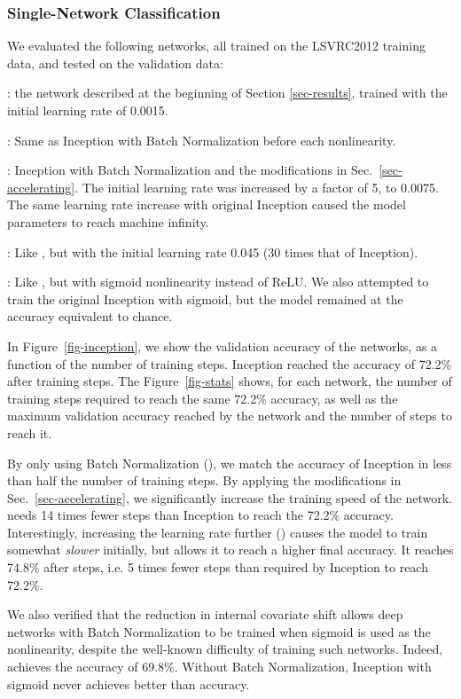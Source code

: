 \documentclass[twocolumn]{article}
\begin{document}
\subsubsection{Single-Network Classification}

We evaluated the following networks, all trained on the LSVRC2012 training data, and tested on the validation data:


: the network described at the beginning of Section \ref{sec-results}, trained with the initial learning rate of 0.0015.

: Same as Inception with Batch Normalization before each nonlinearity.

: Inception with Batch Normalization and the modifications  in Sec.~\ref{sec-accelerating}. The initial learning rate was increased by a factor of 5, to 0.0075. The same learning rate increase with original Inception caused the model parameters to reach machine infinity.

: Like , but with the initial learning rate  0.045 (30 times that of Inception).

: Like , but with sigmoid nonlinearity  instead of ReLU.
We also attempted to train the original Inception with sigmoid, but the model remained at the  accuracy equivalent to chance.

In Figure~\ref{fig-inception}, we show the validation accuracy of the
networks, as a function of the number of training steps.  Inception
reached the accuracy of 72.2\% after  training steps. The
Figure~\ref{fig-stats} shows, for each network, the number of training
steps required to reach the same 72.2\% accuracy, as well as the
maximum validation accuracy reached by the network and the number of steps
to reach it.
 
By only using Batch Normalization (), we match the accuracy of Inception in less than half the number of training steps. By applying the modifications in Sec.~\ref{sec-accelerating}, we significantly increase the training speed of the network.  needs 14 times fewer steps than Inception to reach the 72.2\% accuracy.
Interestingly, increasing the learning rate further ()  causes the model to train somewhat {\em slower} initially, but allows it to reach a higher final accuracy. It  reaches  74.8\% after  steps, i.e. 5 times fewer steps than required by Inception to reach 72.2\%.

We also verified that the  reduction in internal covariate shift allows deep networks with Batch Normalization to be trained when sigmoid is used as the nonlinearity, despite the well-known difficulty of training such networks. Indeed,  achieves the accuracy of  69.8\%. Without Batch Normalization, Inception with sigmoid never achieves better than  accuracy.
\end{document}

